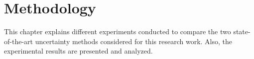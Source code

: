 

\chapter{Methodology}
This chapter explains different experiments conducted to compare the two state-of-the-art uncertainty methods considered for this research work. Also, the experimental results are presented and analyzed.  

